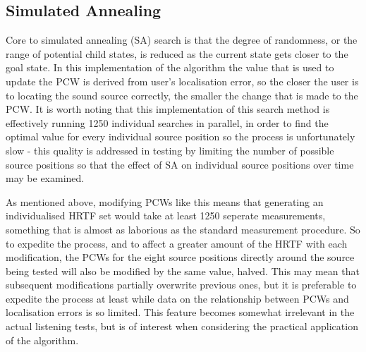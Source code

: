 \subsection{Simulated Annealing}
Core to simulated annealing (SA) search is that the degree of randomness, or the range of potential child states, is reduced as the current state gets closer to the goal state. In this implementation of the algorithm the value that is used to update the PCW is derived from user's localisation error, so the closer the user is to locating the sound source correctly, the smaller the change that is made to the PCW. It is worth noting that this implementation of this search method is effectively running 1250 individual searches in parallel, in order to find the optimal value for every individual source position so the process is unfortunately slow - this quality is addressed in testing by limiting the number of possible source positions so that the effect of SA on individual source positions over time may be examined.

As mentioned above, modifying PCWs like this means that generating an individualised HRTF set would take at least 1250 seperate measurements, something that is almost as laborious as the standard measurement procedure. So to expedite the process, and to affect a greater amount of the HRTF with each modification, the PCWs for the eight source positions directly around the source being tested will also be modified by the same value, halved. This may mean that subsequent modifications partially overwrite previous ones, but it is preferable to expedite the process at least while data on the relationship between PCWs and localisation errors is so limited. This feature becomes somewhat irrelevant in the actual listening tests, but is of interest when considering the practical application of the algorithm.

